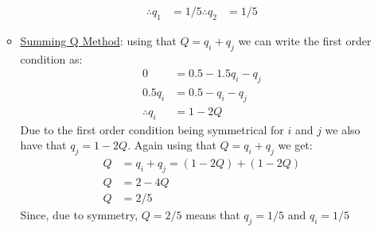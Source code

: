 \documentclass{article}
\begin{document}
\begin{itemize}
\begin{itemize}
\begin{align*}
        \therefore q_{1} &= 1/5
        \therefore q_{2} &= 1/5
      \end{align*}
      \item  \underline{Summing Q Method}: using that $Q = q_{i} + q_{j}$ we can write the first order condition as:
      \begin{align*}
        0 &= 0.5 - 1.5q_{i} - q_{j} \\
        0.5 q_{i} &= 0.5 - q_{i} - q_{j} \\
        \therefore q_{i} &= 1 - 2Q
      \end{align*}
      Due to the first order condition being symmetrical for $i$ and $j$ we also have that $q_{j} = 1 - 2Q$. Again using that $Q = q_{i} + q_{j}$ we get:
      \begin{align*}
        Q &= q_{i} + q_{j} = (1-2Q) + (1-2Q) \\
        Q &= 2 - 4Q \\
        Q &= 2/5
      \end{align*}
      Since, due to symmetry, $Q = 2/5$ means that $q_{j} = 1/5$ and $q_{i} = 1/5$
    \end{itemize}
  \end{itemize}
\par
\end{document}
